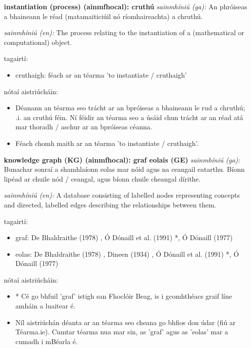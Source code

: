 \documentclass{article}
\begin{document}
\textbf{instantiation (process) (ainmfhocal): cruthú}
\textit{sainmhíniú (ga):} An phróiseas a bhaineann le réad (matamaiticiúil nó ríomhaireachta) a chruthú.

\textit{sainmhíniú (en):} The process relating to the instantiation of a (mathematical or computational) object.

tagairtí:
\begin{itemize}
	\item cruthaigh: féach ar an téarma 'to instantiate / cruthaigh'
\end{itemize}

nótaí aistriúcháin:
\begin{itemize}
	\item Déanann an téarma seo trácht ar an bpróiseas a bhaineann le rud a chruthú; .i. an cruthú féin. Ní féidir an téarma seo a úsáid chun trácht ar an réad atá mar thoradh / aschur ar an bpróiseas céanna.
	\item Féach chomh maith ar an téarma 'to instantiate / cruthaigh'.
\end{itemize}


\textbf{knowledge graph (KG) (ainmfhocal): graf eolais (GE)}
\textit{sainmhíniú (ga):} Bunachar sonraí a shamhlaíonn eolas mar nóid agus na ceangail eatarthu. Bíonn lipéad ar chuile nód / ceangal, agus bíonn chuile cheangal dírithe.

\textit{sainmhíniú (en):} A database consisting of labelled nodes representing concepts and directed, labelled edges describing the relationships between them.

tagairtí:
\begin{itemize}
	\item graf: De Bhaldraithe (1978) \cite{de-bhaldraithe}, Ó Dónaill et al. (1991) \cite{focloir-beag}*, Ó Dónaill (1977) \cite{odonaill}
	\item eolas: De Bhaldraithe (1978) \cite{de-bhaldraithe}, Dineen (1934) \cite{dineen}, Ó Dónaill et al. (1991) \cite{focloir-beag}*, Ó Dónaill (1977) \cite{odonaill}
\end{itemize}

nótaí aistriúcháin:
\begin{itemize}
	\item * Cé go bhfuil 'graf' istigh san Fhoclóir Beag, is i gcomhthéacs graif líne amháin a luaitear é.
	\item Níl aistriúchán déanta ar an téarma seo cheana go bhfios don údar (fiú ar Téarma.ie). Cumtar téarma nua mar sin, as 'graf' agus as 'eolas' mar a cumadh i mBéarla é.
\end{itemize}
\end{document}
